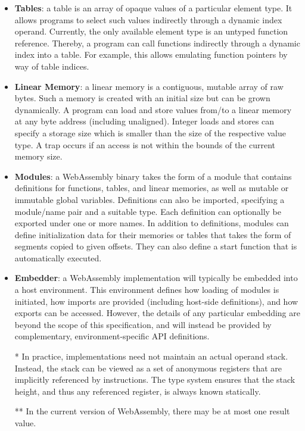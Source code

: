 \begin{itemize}
  \item \textbf{Tables}:
  a table is an array of opaque values of a particular element type. 
  It allows programs to select such values indirectly through a dynamic index operand. 
  Currently, the only available element type is an untyped function reference. 
  Thereby, a program can call functions indirectly through a dynamic index into a table. 
  For example, this allows emulating function pointers by way of table indices.
  
  \item \textbf{Linear Memory}:
  a linear memory is a contiguous, mutable array of raw bytes. 
  Such a memory is created with an initial size but can be grown dynamically. 
  A program can load and store values from/to a linear memory at any byte address (including unaligned). 
  Integer loads and stores can specify a storage size which is smaller than the size of the respective value type. 
  A trap occurs if an access is not within the bounds of the current memory size.
  
  \item \textbf{Modules}:
  a WebAssembly binary takes the form of a module that contains definitions for functions, tables, and linear memories, as well as mutable or immutable global variables. 
  Definitions can also be imported, specifying a module/name pair and a suitable type. 
  Each definition can optionally be exported under one or more names. 
  In addition to definitions, modules can define initialization data for their memories or tables that takes the form of segments copied to given offsets. 
  They can also define a start function that is automatically executed.
  
  \item \textbf{Embedder}:
  a WebAssembly implementation will typically be embedded into a host environment. 
  This environment defines how loading of modules is initiated, how imports are provided (including host-side definitions), and how exports can be accessed. 
  However, the details of any particular embedding are beyond the scope of this specification, and will instead be provided by complementary, environment-specific API definitions.
  
  *	 In practice, implementations need not maintain an actual operand stack. Instead, the stack can be viewed as a set of anonymous registers that are implicitly referenced by instructions. The type system ensures that the stack height, and thus any referenced register, is always known statically.
  
  ** In the current version of WebAssembly, there may be at most one result value.
\end{itemize}

